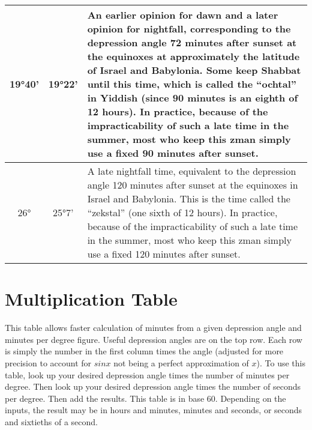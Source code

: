 \begin{tabular}{c | c | p{}}
	19°40'&19°22'&An earlier opinion for dawn and a later opinion for nightfall, corresponding to the depression angle 72 minutes after sunset at the equinoxes at approximately the latitude of Israel and Babylonia. Some keep Shabbat until this time, which is called the “ochtal” in Yiddish (since 90 minutes is an eighth of 12 hours). In practice, because of the impracticability of such a late time in the summer, most who keep this zman simply use a fixed 90 minutes after sunset.\\\hline
	26°&25°7'&A late nightfall time, equivalent to the depression angle 120 minutes after sunset at the equinoxes in Israel and Babylonia. This is the time called the “zekstal” (one sixth of 12 hours). In practice, because of the impracticability of such a late time in the summer, most who keep this zman simply use a fixed 120 minutes after sunset.\\\hline
\end{tabular}

\section{Multiplication Table}

This table allows faster calculation of minutes from a given depression angle and minutes per degree figure. Useful depression angles are on the top row. Each row is simply the number in the first column times the angle (adjusted for more precision to account for $sin{x}$ not being a perfect approximation of $x$). To use this table, look up your desired depression angle times the number of minutes per degree. Then look up your desired depression angle times the number of seconds per degree. Then add the results. This table is in base 60. Depending on the inputs, the result may be in hours and minutes, minutes and seconds, or seconds and sixtieths of a second. 

